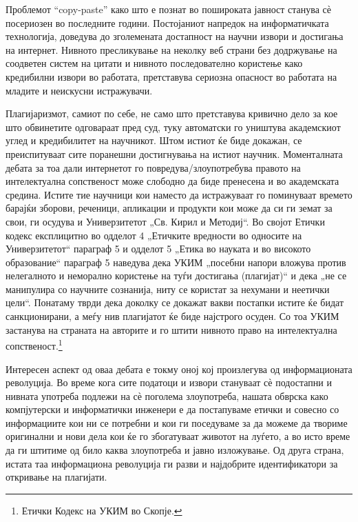 \documentclass[12pt,a4paper]{article}
\begin{document}
Проблемот ``copy-paste'' како што е познат во пошироката јавност станува сѐ
посериозен во последните години. Постојаниот напредок на информатичката
технологија, доведува до зголемената достапност на научни извори и достигања на
интернет. Нивното пресликување на неколку веб страни без додржување на
соодветен систем на цитати и нивното последователно користење како кредибилни
извори во работата, претставува сериозна опасност во работата на младите и
неискусни истражувачи.
 
Плагијаризмот, самиот по себе, не само што претставува кривично дело за кое што
обвинетите одговараат пред суд, туку автоматски го уништува академскиот углед и 
кредибилитет на научникот. Штом истиот ќе биде докажан, се преиспитуваат сите
поранешни достигнувања на истиот научник. Моменталната дебата за тоа дали
интернетот го повредува/злоупотребува правото на интелектуална сопственост може
слободно да биде пренесена и во академската средина. Истите тие научници кои
наместо да истражуваат го поминуваат времето барајќи зборови, реченици,
апликации и продукти кои може да си ги земат за свои, ги осудува и Универзитетот
„Св. Кирил и Методиј“. Во својот Етички кодекс експлицитно во одделот 4
„Етичките вредности во односите на Универзитетот“ параграф 5 и одделот 5 „Етика
во науката и во високото образование“ параграф 5 наведува дека УКИМ
„посебни напори вложува против нелегалното и неморално користење на туѓи
достигања (плагијат)“ и дека „не се манипулира со научните сознанија, ниту се
користат за нехумани и неетички цели“. Понатаму тврди дека доколку се докажат
вакви постапки истите ќе бидат санкционирани, а меѓу нив плагијатот ќе биде
најстрого осуден. Со тоа УКИМ застанува на страната на авторите и го штити
нивното право на интелектуална сопственост.\footnote{Етички Кодекс на УКИМ во Скопје.}

Интересен аспект од оваа дебата е токму оној кој произлегува од информационата
револуција. Во време кога сите податоци и извори стануваат сѐ подостапни и
нивната употреба подлежи на сѐ поголема злоупотреба, нашата обврска како
компјутерски и информатички инженери е да постапуваме етички и совесно со
информациите кои ни се потребни и кои ги поседуваме за да можеме да твориме
оригинални и нови дела кои ќе го збогатуваат животот на луѓето, а во
исто време да ги штитиме од било каква злоупотреба и јавно изложување. Од друга
страна, истата таа информациона револуција ги разви и најдобрите идентификатори
за откривање на плагијати.
\end{document}
